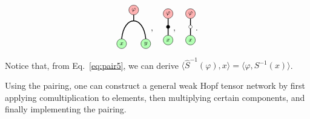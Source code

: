 \documentclass[a4paper,11pt]{article}
\theoremstyle{theorem}
\theoremstyle{remark}
\begin{document}
\begin{equation}
    \begin{aligned}
			\begin{tikzpicture}
				 \draw[black, line width=1.0pt]  (-0.5, 0) .. controls (-0.4, 1) and (0.4, 1) .. (0.5, 0);
				 \draw[black, line width=1.0pt]  (0,0.75)--(0,1.15);
			 \filldraw[red!30, draw=black] 
                (0,1.2) circle (0.2);
         \node at (0, 1.2) {$\scriptstyle \varphi$};
          \filldraw[green!30, draw=black] 
                (-0.5,-.2) circle (0.2);
    \node at (-0.5, -0.2) {$\scriptstyle x$};
 \filldraw[green!30, draw=black] 
                (0.5,-.2) circle (0.2);
    \node at (0.5, -0.2) {$\scriptstyle y$};
				\end{tikzpicture}
			\end{aligned}, \quad \begin{aligned}
\begin{tikzpicture}
    \draw[black, line width=1.0pt] (0,0) -- (0,0.7);    
    \filldraw[red!30, draw=black] 
                      (0,.9) circle (0.2);
    \node at (0, 0.9) {$\scriptstyle \varphi$};
      \filldraw[green!30, draw=black] 
                       (0,-.2) circle (0.2);
    \node at (0, -0.2) {$\scriptstyle x$};
       \filldraw[black] (0, 0.35) circle (2pt);
\end{tikzpicture}
\end{aligned},
\quad \begin{aligned}
\begin{tikzpicture}
    \draw[black, line width=1.0pt] (0,0) -- (0,0.7);    
    \filldraw[red!30, draw=black] 
                      (0,.9) circle (0.2);
    \node at (0, 0.9) {$\scriptstyle \varphi$};
      \filldraw[green!30, draw=black] 
                       (0,-.2) circle (0.2);
    \node at (0, -0.2) {$\scriptstyle x$};
       \filldraw[white, draw= black] (0, 0.35) circle (2pt);
\end{tikzpicture}
\end{aligned}.
\end{equation}
Notice that, from Eq.~\eqref{eq:pair5}, we can derive $\langle \hat{S}^{-1}(\varphi), x \rangle = \langle \varphi, S^{-1}(x) \rangle$.


Using the pairing, one can construct a general weak Hopf tensor network by first applying comultiplication to elements, then multiplying certain components, and finally implementing the pairing.
\end{document}
